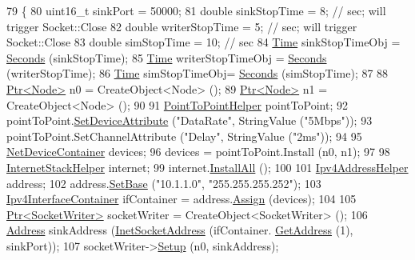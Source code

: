 \begin{DoxyCode}
79 \{
80   uint16\_t sinkPort = 50000;
81   \textcolor{keywordtype}{double} sinkStopTime = 8;  \textcolor{comment}{// sec; will trigger Socket::Close}
82   \textcolor{keywordtype}{double} writerStopTime = 5;  \textcolor{comment}{// sec; will trigger Socket::Close}
83   \textcolor{keywordtype}{double} simStopTime = 10;  \textcolor{comment}{// sec}
84   \hyperlink{classns3_1_1Time}{Time} sinkStopTimeObj = \hyperlink{group__timecivil_ga33c34b816f8ff6628e33d5c8e9713b9e}{Seconds} (sinkStopTime);
85   \hyperlink{classns3_1_1Time}{Time} writerStopTimeObj = \hyperlink{group__timecivil_ga33c34b816f8ff6628e33d5c8e9713b9e}{Seconds} (writerStopTime);
86   \hyperlink{classns3_1_1Time}{Time} simStopTimeObj= \hyperlink{group__timecivil_ga33c34b816f8ff6628e33d5c8e9713b9e}{Seconds} (simStopTime);
87 
88   \hyperlink{classns3_1_1Ptr}{Ptr<Node>} n0 = CreateObject<Node> ();
89   \hyperlink{classns3_1_1Ptr}{Ptr<Node>} n1 = CreateObject<Node> ();
90 
91   \hyperlink{classns3_1_1PointToPointHelper}{PointToPointHelper} pointToPoint;
92   pointToPoint.\hyperlink{classns3_1_1PointToPointHelper_a4577f5ab8c387e5528af2e0fbab1152e}{SetDeviceAttribute} (\textcolor{stringliteral}{"DataRate"}, StringValue (\textcolor{stringliteral}{"5Mbps"}));
93   pointToPoint.SetChannelAttribute (\textcolor{stringliteral}{"Delay"}, StringValue (\textcolor{stringliteral}{"2ms"}));
94 
95   \hyperlink{classns3_1_1NetDeviceContainer}{NetDeviceContainer} devices;
96   devices = pointToPoint.Install (n0, n1);
97 
98   \hyperlink{classns3_1_1InternetStackHelper}{InternetStackHelper} internet;
99   internet.\hyperlink{classns3_1_1InternetStackHelper_a6cfa73782fd4071c4cfbd73ebf1bbb44}{InstallAll} ();
100 
101   \hyperlink{classns3_1_1Ipv4AddressHelper}{Ipv4AddressHelper} address;
102   address.\hyperlink{classns3_1_1Ipv4AddressHelper_acf7b16dd25bac67e00f5e25f90a9a035}{SetBase} (\textcolor{stringliteral}{"10.1.1.0"}, \textcolor{stringliteral}{"255.255.255.252"});
103   \hyperlink{classns3_1_1Ipv4InterfaceContainer}{Ipv4InterfaceContainer} ifContainer = address.\hyperlink{classns3_1_1Ipv4AddressHelper_af8e7f4a1a7e74c00014a1eac445a27af}{Assign} (devices);
104 
105   \hyperlink{classns3_1_1Ptr}{Ptr<SocketWriter>} socketWriter = CreateObject<SocketWriter> ();
106   \hyperlink{classns3_1_1Address}{Address} sinkAddress (\hyperlink{classns3_1_1InetSocketAddress}{InetSocketAddress} (ifContainer.
      \hyperlink{classns3_1_1Ipv4InterfaceContainer_ae63208dcd222be986822937ee4aa828c}{GetAddress} (1), sinkPort));
107   socketWriter->\hyperlink{classns3_1_1SocketWriter_a79db65c3883555f22681d8ffabd206e4}{Setup} (n0, sinkAddress);

\end{DoxyCode}
